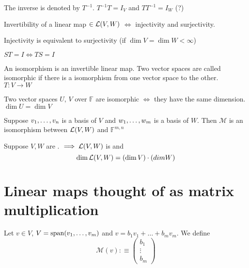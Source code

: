 \begin{thm}
    The inverse is denoted by $T^{-1}$. $T^{-1}T=I_V$ and $T T^{-1} = I_W$ (?)
\end{thm}

\begin{thm}
    Invertibility of a linear map $\in {\mathcal{L}(V,W)}$ $\Leftrightarrow$ injectivity and surjectivity.
\end{thm}

\setcounter{thm}{64}
\begin{thm}
    Injectivity is equivalent to surjectivity (if $\dim V = \dim W < \infty$)
\end{thm}

\setcounter{thm}{67}
\begin{thm}
    $ST = I \Leftrightarrow TS=I$
\end{thm}

\begin{thm}
    An isomorphism is an invertible linear map. Two vector spaces are called isomorphic if there is a isomorphism from one vector space to the other. $T:V\to W$ 
\end{thm}

\begin{thm}
    Two \fd vector spaces $U$, $V$ over $\mathbb{F}$ are isomorphic $\iff$ they have the same dimension. $\dim U = \dim V$
\end{thm}

\begin{thm}
    Suppose $v_1, \dots, v_n$ is a basis of $V$ and $w_1, \dots, w_m$ is a basis of $W$. Then $\mathcal{M}$ is an isomorphism between ${\mathcal{L}(V,W)}$ and $\mathbb{F}^{m,n}$ 
\end{thm}

\begin{thm}
    Suppose $V,W$ are \fd. $\implies {\mathcal{L}(V,W)}$ is \fd and 
    \begin{equation}
    	\dim {\mathcal{L}(V,W)} = (\dim V)\cdot(dim W)
    \end{equation}
\end{thm}

\section{Linear maps thought of as matrix multiplication}
Let $v \in V$, $V=\operatorname{span} (v_1, \dots, v_m)$ and $v=b_1v_1+\dots+b_mv_m$. We define
\begin{equation}
	\mathcal{M}(v) :\equiv 
	\left (
	\begin{matrix} 
		b_1 \\ \vdots \\ b_m 
	\end{matrix}
	\right )
\end{equation}

